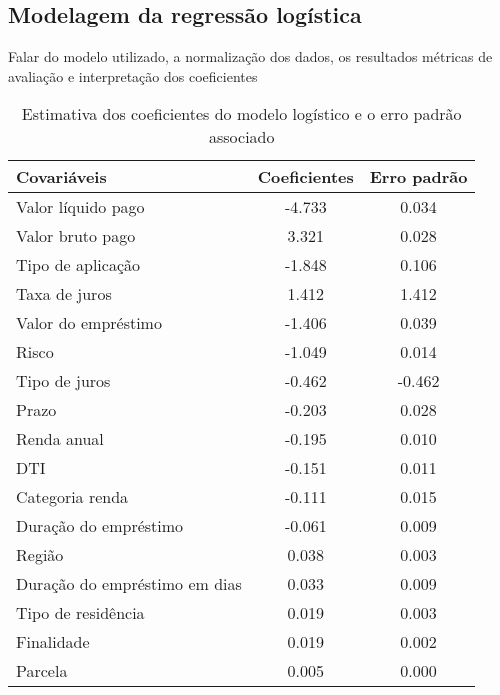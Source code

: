 \subsection*{Modelagem da regressão logística}
Falar do modelo utilizado, a normalização dos dados, os resultados
métricas de avaliação e interpretação dos coeficientes


\begin{table}[H]
\centering
\begin{tabular}{lcc}
  \toprule
    \textbf{Covariáveis} & \textbf{Coeficientes} &  \textbf{Erro padrão} \\
  \midrule
        Valor líquido pago & -4.733 &  0.034 \\
        Valor bruto pago &  3.321 &  0.028 \\
        Tipo de aplicação & -1.848 &  0.106 \\
        Taxa de juros &  1.412 &  1.412 \\
        Valor do empréstimo & -1.406 &  0.039 \\
        Risco & -1.049 &  0.014 \\
        Tipo de juros & -0.462 &  -0.462  \\
        Prazo & -0.203 &  0.028 \\
        Renda anual & -0.195 &  0.010 \\
        DTI & -0.151 &  0.011 \\
        Categoria renda & -0.111 &  0.015 \\
        Duração do empréstimo & -0.061 &  0.009 \\
        Região &  0.038 &  0.003\\
        Duração do empréstimo em dias &  0.033 &  0.009 \\
        Tipo de residência &  0.019 &  0.003 \\
        Finalidade &  0.019 &  0.002  \\
        Parcela &  0.005 &  0.000  \\
  \bottomrule
\end{tabular}
\caption{Estimativa dos coeficientes do modelo logístico e o erro padrão associado}
\label{tab:result_model_logist}
\end{table}

